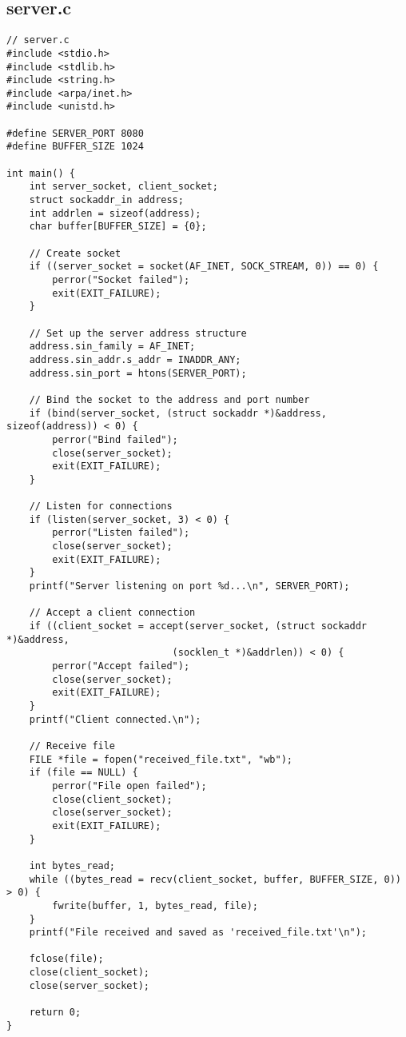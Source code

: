 \documentclass{article}
\begin{document}
\subsection{server.c}
\begin{lstlisting}
// server.c
#include <stdio.h>
#include <stdlib.h>
#include <string.h>
#include <arpa/inet.h>
#include <unistd.h>

#define SERVER_PORT 8080
#define BUFFER_SIZE 1024

int main() {
    int server_socket, client_socket;
    struct sockaddr_in address;
    int addrlen = sizeof(address);
    char buffer[BUFFER_SIZE] = {0};

    // Create socket
    if ((server_socket = socket(AF_INET, SOCK_STREAM, 0)) == 0) {
        perror("Socket failed");    
        exit(EXIT_FAILURE);
    }

    // Set up the server address structure
    address.sin_family = AF_INET;
    address.sin_addr.s_addr = INADDR_ANY;
    address.sin_port = htons(SERVER_PORT);

    // Bind the socket to the address and port number
    if (bind(server_socket, (struct sockaddr *)&address, sizeof(address)) < 0) {
        perror("Bind failed");
        close(server_socket);
        exit(EXIT_FAILURE);
    }

    // Listen for connections
    if (listen(server_socket, 3) < 0) {
        perror("Listen failed");
        close(server_socket);
        exit(EXIT_FAILURE);
    }
    printf("Server listening on port %d...\n", SERVER_PORT);

    // Accept a client connection
    if ((client_socket = accept(server_socket, (struct sockaddr *)&address, 
                             (socklen_t *)&addrlen)) < 0) {
        perror("Accept failed");
        close(server_socket);
        exit(EXIT_FAILURE);
    }
    printf("Client connected.\n");

    // Receive file
    FILE *file = fopen("received_file.txt", "wb");
    if (file == NULL) {
        perror("File open failed");
        close(client_socket);
        close(server_socket);
        exit(EXIT_FAILURE);
    }

    int bytes_read;
    while ((bytes_read = recv(client_socket, buffer, BUFFER_SIZE, 0)) > 0) {
        fwrite(buffer, 1, bytes_read, file);
    }
    printf("File received and saved as 'received_file.txt'\n");

    fclose(file);
    close(client_socket);
    close(server_socket);

    return 0;
}
\end{lstlisting}
\end{document}
